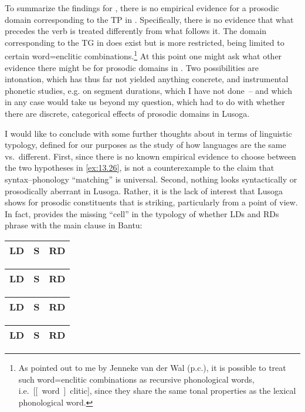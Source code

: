 \documentclass[output=paper]{langsci/langscibook}
\begin{document}
To summarize the findings for , there is no empirical evidence for a
prosodic domain corresponding to the \gls{TP} in .
Specifically, there is no evidence that what precedes the verb is treated
differently from what follows it. The domain corresponding to the
\gls{TG} in  does exist but is more restricted, being limited to
certain word=enclitic combinations.\footnote{As pointed out to me by Jenneke
    van der Wal (p.c.), it is possible to treat such word=enclitic combinations
    as recursive phonological words, i.e.\ [[~word~]~clitic],
since they share the same tonal properties as the lexical phonological word.}
At this point one might ask what other evidence there might be for prosodic
domains in .  Two possibilities are intonation,
which has thus far not yielded anything concrete, and instrumental phonetic
studies, e.g. on segment durations, which I have not done~-- and which in any case
would take us beyond my question, which had to do with whether there are
discrete, categorical effects of prosodic domains in Lusoga.

I would like to conclude with some further thoughts about  in terms of
linguistic typology, defined for our purposes as the study of how languages are
the same vs.\ different. First, since there is no known empirical evidence to
choose between the two hypotheses in \eqref{ex:13.26},  is not a
counterexample to the claim that syntax--phonology “matching” is universal.  Second, nothing looks syntactically or
prosodically aberrant in Lusoga. Rather, it is the lack of interest that Lusoga
shows for prosodic constituents that is striking, particularly from a 
point of view. In fact,  provides the missing “cell” in the typology of
whether \glspl{LD} and \glspl{RD}
phrase with the main clause in Bantu:

\ea\label{ex:13.46}
    \begin{multicols}{2}
    \ea \begin{tabular}{|c|cc|}\hline \gls{LD} & S & RD\\\hline\end{tabular}\quad {}
    \ex \begin{tabular}{|cc|c|}\hline \gls{LD} & S & RD\\\hline\end{tabular}\quad {}
    \ex \begin{tabular}{|c|c|c|}\hline \gls{LD} & S & RD\\\hline\end{tabular}\quad {}
    \ex \begin{tabular}{|ccc|}\hline \gls{LD} & S & RD\\\hline\end{tabular}\quad {}
    \z
    \end{multicols}
\z
\end{document}
